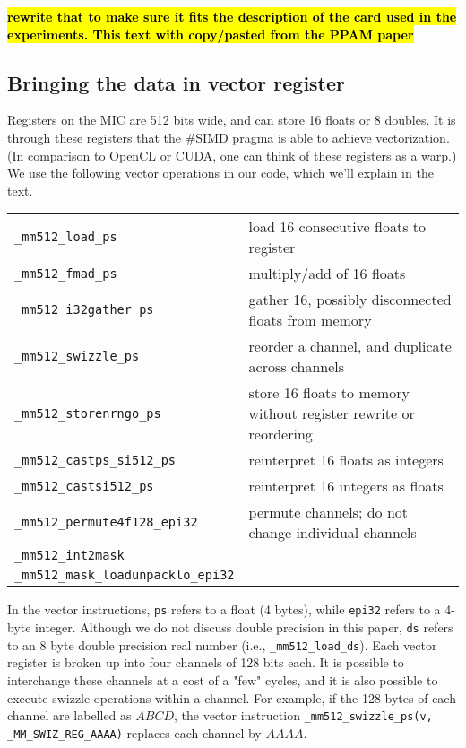 \documentclass[10pt, conference, compsocconf]{IEEEtran}
\def\blue#1{\textbf{\textcolor{blue}{#1}}}
\def\qes#1{{\blue{*** For Erik: #1 ***}}}
\def\ttt#1{{\tt #1}}
\newcommand{\todo}[1]{\color{red}\textbf{\hl{#1}}\color{black}\xspace}
\def\qes#1{}
\begin{document}
\todo{rewrite that to make sure it fits the description of the card
  used in the experiments. This text with copy/pasted from the PPAM
  paper}

\subsection{Bringing the data in vector register}


Registers on the MIC are 512 bits wide, and can store 16 floats or 8
doubles. It is through these registers that the \#SIMD pragma is able
to achieve vectorization. (In comparison to OpenCL or CUDA, one can
think of these registers as a warp.)  We use the following vector
operations in our code, which we'll explain in the text.

\def\loadps{\ttt{\_mm512\_load\_ps}}
\def\loadds{\ttt{\_mm512\_load\_ds}}
\def\fmadps{\ttt{\_mm512\_fmad\_ps}}
\def\gatherps{\ttt{\_mm512\_i32gather\_ps}}
\def\swizzleps{\ttt{\_mm512\_swizzle\_ps}}
\def\storenrngops{\ttt{\_mm512\_storenrngo\_ps}}
\def\castsi{\ttt{\_mm512\_castsi512\_ps}}
\def\permute{\ttt{\_mm512\_permute4f128\_epi32}}
\def\intmask{\ttt{\_mm512\_int2mask}}
\def\loadunpack{\ttt{\_mm512\_mask\_loadunpacklo\_epi32}}
\def\castitops{\ttt{\_mm512\_castsi512\_ps}}
\def\castpstoi{\ttt{\_mm512\_castps\_si512\_ps}}
%
\begin{center}
\begin{tabular}{|l|l|}
\hline
\loadps &  load 16 consecutive floats to register\\
\fmadps &  multiply/add of 16 floats\\
\gatherps &  gather 16, possibly disconnected floats from memory\\
\swizzleps &  reorder a channel, and duplicate across channels\\
\storenrngops &  store 16 floats to memory without register rewrite or reordering\\
\castpstoi & reinterpret 16 floats as integers\\
\castitops & reinterpret 16 integers as floats\\
\permute &  permute channels; do not change individual channels\\
\intmask &  \\
\loadunpack &  \\
\hline
\end{tabular}
\end{center}
%
In the vector instructions, \ttt{ps} refers to a float (4 bytes), while \ttt{epi32} refers to a 4-byte integer. Although we do not discuss double precision in this paper, \ttt{ds} refers to an 8 byte double precision real number (i.e., \loadds). 
Each vector register is broken up into four channels of 128 bits each. It is possible to interchange these channels at a cost of a "few" \qes{exact numbers?} cycles, and it is also possible to execute swizzle operations within a channel. For example, if the 128 bytes of each channel are labelled as $ABCD$, the vector instruction 
\ttt{\_mm512\_swizzle\_ps(v, \_MM\_SWIZ\_REG\_AAAA)}
replaces each channel by $AAAA$. 
\end{document}
